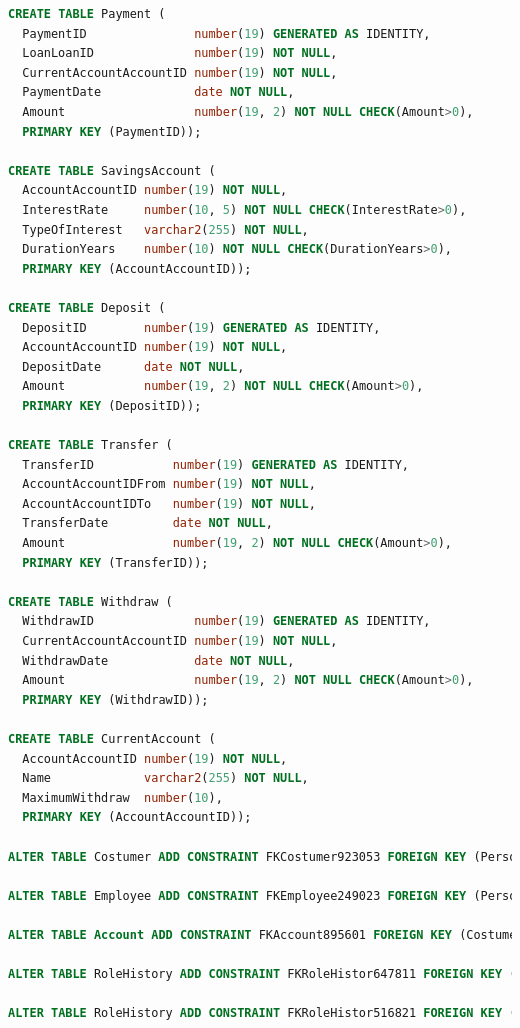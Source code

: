 \documentclass[a4paper, 10pt]{article}
\begin{document}
\begin{lstlisting}[language=SQL]
CREATE TABLE Payment (
  PaymentID               number(19) GENERATED AS IDENTITY, 
  LoanLoanID              number(19) NOT NULL, 
  CurrentAccountAccountID number(19) NOT NULL, 
  PaymentDate             date NOT NULL, 
  Amount                  number(19, 2) NOT NULL CHECK(Amount>0), 
  PRIMARY KEY (PaymentID));

CREATE TABLE SavingsAccount (
  AccountAccountID number(19) NOT NULL, 
  InterestRate     number(10, 5) NOT NULL CHECK(InterestRate>0), 
  TypeOfInterest   varchar2(255) NOT NULL, 
  DurationYears    number(10) NOT NULL CHECK(DurationYears>0), 
  PRIMARY KEY (AccountAccountID));

CREATE TABLE Deposit (
  DepositID        number(19) GENERATED AS IDENTITY, 
  AccountAccountID number(19) NOT NULL, 
  DepositDate      date NOT NULL, 
  Amount           number(19, 2) NOT NULL CHECK(Amount>0), 
  PRIMARY KEY (DepositID));

CREATE TABLE Transfer (
  TransferID           number(19) GENERATED AS IDENTITY, 
  AccountAccountIDFrom number(19) NOT NULL, 
  AccountAccountIDTo   number(19) NOT NULL, 
  TransferDate         date NOT NULL, 
  Amount               number(19, 2) NOT NULL CHECK(Amount>0), 
  PRIMARY KEY (TransferID));

CREATE TABLE Withdraw (
  WithdrawID              number(19) GENERATED AS IDENTITY, 
  CurrentAccountAccountID number(19) NOT NULL, 
  WithdrawDate            date NOT NULL, 
  Amount                  number(19, 2) NOT NULL CHECK(Amount>0), 
  PRIMARY KEY (WithdrawID));

CREATE TABLE CurrentAccount (
  AccountAccountID number(19) NOT NULL, 
  Name             varchar2(255) NOT NULL, 
  MaximumWithdraw  number(10), 
  PRIMARY KEY (AccountAccountID));

ALTER TABLE Costumer ADD CONSTRAINT FKCostumer923053 FOREIGN KEY (PersonGovID) REFERENCES Person (GovID);

ALTER TABLE Employee ADD CONSTRAINT FKEmployee249023 FOREIGN KEY (PersonGovID) REFERENCES Person (GovID);

ALTER TABLE Account ADD CONSTRAINT FKAccount895601 FOREIGN KEY (CostumerCostumerID) REFERENCES Costumer (CostumerID);

ALTER TABLE RoleHistory ADD CONSTRAINT FKRoleHistor647811 FOREIGN KEY (RoleRoleID) REFERENCES Role (RoleID);

ALTER TABLE RoleHistory ADD CONSTRAINT FKRoleHistor516821 FOREIGN KEY (EmployeeEmployeeID) REFERENCES Employee (EmployeeID);


\end{lstlisting}
\end{document}
